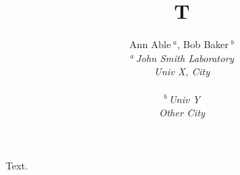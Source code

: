 \documentclass[conference]{IEEEtran}
\title{T}
\author{{Ann Able{\small $~^{a}$}, Bob Baker{\small $~^{b}$} }
{}\vspace{1.6mm}\\ \itshape
$^{a}$\,John Smith Laboratory\\ Univ X, City\\ \,\\
$^{b}$\,Univ Y\\ Other City\\}
\begin{document}
\maketitle
Text.
\end{document}
